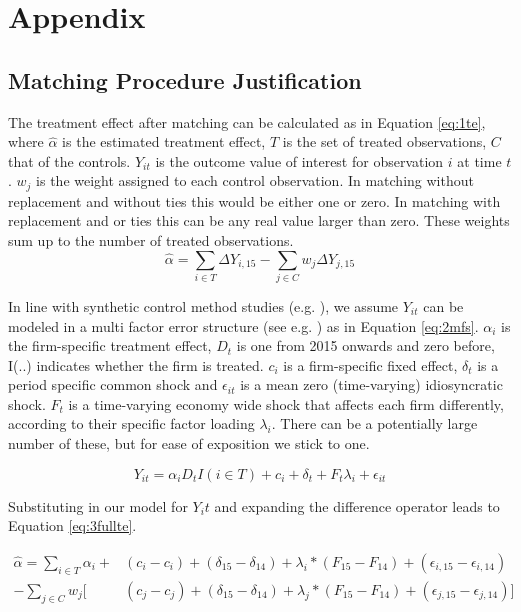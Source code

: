 \appendix
\section{Appendix}
\subsection{Matching Procedure Justification}
The treatment effect after matching can be calculated as in Equation \ref{eq:1te}, where $\hat{\alpha}$ is the estimated treatment effect, $T$ is the set of treated observations, $C$ that of the controls. $Y_{it}$ is the outcome value of interest for observation $i$ at time $t$. $w_j$ is the weight assigned to each control observation. In matching without replacement and without ties this would be either one or zero. In matching with replacement and or ties this can be any real value larger than zero. These weights sum up to the number of treated observations.
\begin{equation} \label{eq:1te}
    \hat{\alpha} = \sum_{i \in T} \Delta Y_{i, 15} - \sum_{j \in C} w_j \Delta Y_{j,15}
\end{equation}

In line with synthetic control method studies (e.g. \citealp{Abadie2006, Dube2015}), we assume $Y_{it}$ can be modeled in a multi factor error structure (see e.g. \citealp{Chudik2015, Bai2009}) as in Equation \ref{eq:2mfs}. $\alpha_i$ is the firm-specific treatment effect, $D_t$ is one from 2015 onwards and zero before, I(..) indicates whether the firm is treated. $c_i$ is a firm-specific fixed effect, $\delta_t$ is a period specific common shock and $\epsilon_{it}$ is a mean zero (time-varying) idiosyncratic shock. $F_t$ is a time-varying economy wide shock that affects each firm differently, according to their specific factor loading $\lambda_i$. There can be a potentially large number of these, but for ease of exposition we stick to one.

\begin{equation}\label{eq:2mfs}
    Y_{it} = \alpha_i D_t I(i \in T) + c_i + \delta_t + F_t \lambda_i + \epsilon_{it}
\end{equation}

Substituting in our model for $Y_it$ and expanding the difference operator leads to Equation \ref{eq:3fullte}.

\begin{equation}\label{eq:3fullte}
    \begin{split}
         \hat{\alpha} =\sum_{i \in T} \alpha_i + &(c_i - c_i) + (\delta_{15} - \delta_{14}) + \lambda_i * (F_{15} - F_{14}) + (\epsilon_{i,15} - \epsilon_{i,14})  \\
         - \sum_{j \in C} w_j [ &(c_j - c_j) + (\delta_{15} - \delta_{14}) + \lambda_j * (F_{15} - F_{14}) + (\epsilon_{j,15} - \epsilon_{j,14})]
    \end{split}
\end{equation}

